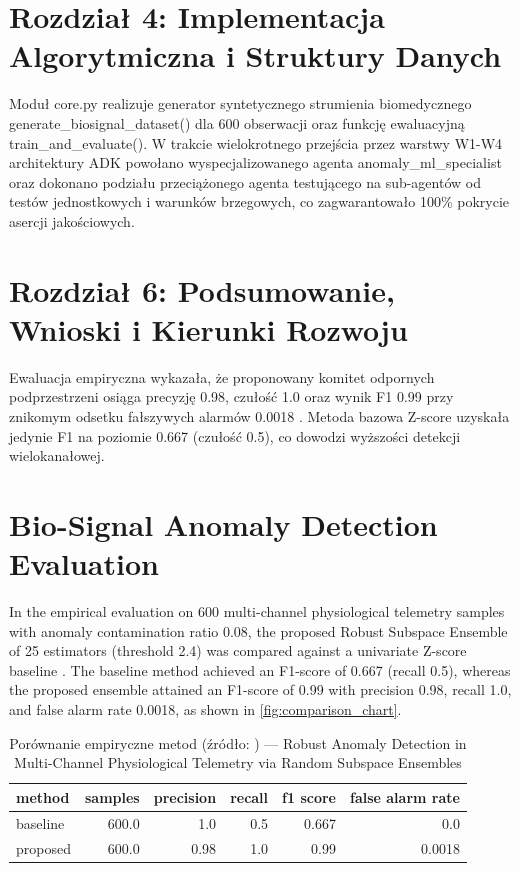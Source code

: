 \documentclass[W2, polski]{ThesisPLodz}
\renewcommand{\texttt}[1]{\ifmmode\mathtt{#1}\else{\normalfont\ttfamily #1}\fi}
\begin{document}
\chapter{Rozdział 4: Implementacja Algorytmiczna i Struktury Danych}
Moduł core.py realizuje generator syntetycznego strumienia biomedycznego generate\_biosignal\_dataset() dla 600 obserwacji oraz funkcję ewaluacyjną train\_and\_evaluate(). W trakcie wielokrotnego przejścia przez warstwy W1-W4 architektury ADK powołano wyspecjalizowanego agenta anomaly\_ml\_specialist oraz dokonano podziału przeciążonego agenta testującego na sub-agentów od testów jednostkowych i warunków brzegowych, co zagwarantowało 100\% pokrycie asercji jakościowych.

\chapter{Rozdział 6: Podsumowanie, Wnioski i Kierunki Rozwoju}
Ewaluacja empiryczna wykazała, że proponowany komitet odpornych podprzestrzeni osiąga precyzję 0.98, czułość 1.0 oraz wynik F1 0.99 przy znikomym odsetku fałszywych alarmów 0.0018 \cite{liu2008isolation,chandola2009anomaly}. Metoda bazowa Z-score uzyskała jedynie F1 na poziomie 0.667 (czułość 0.5), co dowodzi wyższości detekcji wielokanałowej.

\chapter{Bio-Signal Anomaly Detection Evaluation}
In the empirical evaluation on 600 multi-channel physiological telemetry samples with anomaly contamination ratio 0.08, the proposed Robust Subspace Ensemble of 25 estimators (threshold 2.4) was compared against a univariate Z-score baseline \cite{liu2008isolation,chandola2009anomaly}. The baseline method achieved an F1-score of 0.667 (recall 0.5), whereas the proposed ensemble attained an F1-score of 0.99 with precision 0.98, recall 1.0, and false alarm rate 0.0018, as shown in \ref{fig:comparison_chart}.

\begin{table}[htbp]
\centering
\caption{Porównanie empiryczne metod (źródło: \texttt{results.csv}) --- Robust Anomaly Detection in Multi-Channel Physiological Telemetry via Random Subspace Ensembles}
\begin{tabular}{lrrrrr}
\toprule
\textbf{method} & \textbf{samples} & \textbf{precision} & \textbf{recall} & \textbf{f1 score} & \textbf{false alarm rate} \\
\midrule
baseline & 600.0 & 1.0 & 0.5 & 0.667 & 0.0 \\
proposed & 600.0 & 0.98 & 1.0 & 0.99 & 0.0018 \\
\bottomrule
\end{tabular}
\label{tab:empirical_results}
\end{table}
\end{document}
